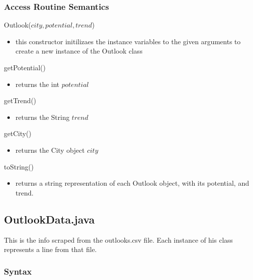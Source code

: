 \documentclass[12pt,fleqn]{article}
\begin{document}
\subsubsection*{Access Routine Semantics}
\noindent Outlook($city, potential, trend$)
\begin{itemize}
\item this constructor initilizaes the instance variables to the given arguments to create a new instance of the Outlook class
\end{itemize}
\noindent getPotential()
\begin{itemize}
\item returns the int $potential$
\end{itemize}
\noindent getTrend()
\begin{itemize}
\item returns the String $trend$
\end{itemize}
\noindent getCity()
\begin{itemize}
\item returns the City object $city$
\end{itemize}
\noindent toString()
\begin{itemize}
\item returns a string representation of each Outlook object, with its potential, and trend.
\end{itemize}


\subsection*{OutlookData.java}\label{outlookd}
This is the info scraped from the outlooks.csv file. Each instance of his class represents a line from that file.
\subsubsection* {Syntax}
\end{document}
